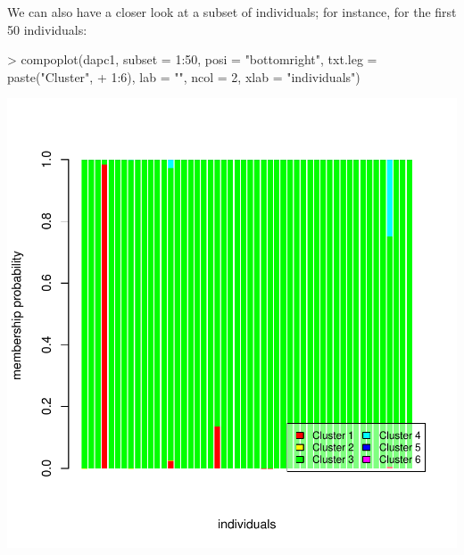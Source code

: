 \documentclass{article}
\begin{document}
\noindent We can also have a closer look at a subset of individuals; for instance, for the first 50 individuals:
\begin{Schunk}
\begin{Sinput}
> compoplot(dapc1, subset = 1:50, posi = "bottomright", txt.leg = paste("Cluster", 
+     1:6), lab = "", ncol = 2, xlab = "individuals")
\end{Sinput}
\end{Schunk}
\includegraphics{figs/dapc-024}
\end{document}

